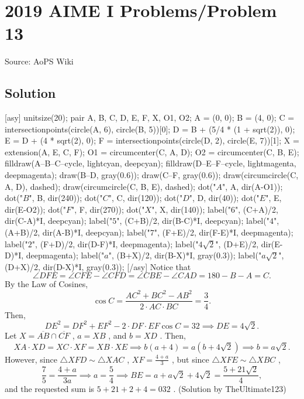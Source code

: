 \documentclass[12pt]{article}
\begin{document}
\section*{{2019 AIME I Problems/Problem 13}}
Source: AoPS Wiki

\subsection*{Solution}
[asy] unitsize(20); pair A, B, C, D, E, F, X, O1, O2; A = (0, 0); B = (4, 0); C = intersectionpoints(circle(A, 6), circle(B, 5))[0]; D = B + (5/4 * (1 + sqrt(2)), 0); E = D + (4 * sqrt(2), 0); F = intersectionpoints(circle(D, 2), circle(E, 7))[1]; X = extension(A, E, C, F); O1 = circumcenter(C, A, D); O2 = circumcenter(C, B, E); filldraw(A--B--C--cycle, lightcyan, deepcyan); filldraw(D--E--F--cycle, lightmagenta, deepmagenta); draw(B--D, gray(0.6)); draw(C--F, gray(0.6)); draw(circumcircle(C, A, D), dashed); draw(circumcircle(C, B, E), dashed); dot("$A$", A, dir(A-O1)); dot("$B$", B, dir(240)); dot("$C$", C, dir(120)); dot("$D$", D, dir(40)); dot("$E$", E, dir(E-O2)); dot("$F$", F, dir(270)); dot("$X$", X, dir(140)); label("$6$", (C+A)/2, dir(C-A)*I, deepcyan); label("$5$", (C+B)/2, dir(B-C)*I, deepcyan); label("$4$", (A+B)/2, dir(A-B)*I, deepcyan); label("$7$", (F+E)/2, dir(F-E)*I, deepmagenta); label("$2$", (F+D)/2, dir(D-F)*I, deepmagenta); label("$4\sqrt{2}$", (D+E)/2, dir(E-D)*I, deepmagenta); label("$a$", (B+X)/2, dir(B-X)*I, gray(0.3)); label("$a\sqrt{2}$", (D+X)/2, dir(D-X)*I, gray(0.3)); [/asy] Notice that \[\angle DFE=\angle CFE-\angle CFD=\angle CBE-\angle CAD=180-B-A=C.\] By the Law of Cosines, \[\cos C=\frac{AC^2+BC^2-AB^2}{2\cdot AC\cdot BC}=\frac34.\] Then, \[DE^2=DF^2+EF^2-2\cdot DF\cdot EF\cos C=32\implies DE=4\sqrt2.\] Let $X=\overline{AB}\cap\overline{CF}$ , $a=XB$ , and $b=XD$ . Then, \[XA\cdot XD=XC\cdot XF=XB\cdot XE\implies b(a+4)=a(b+4\sqrt2)\implies b=a\sqrt2.\] However, since $\triangle XFD\sim\triangle XAC$ , $XF=\tfrac{4+a}3$ , but since $\triangle XFE\sim\triangle XBC$ , \[\frac75=\frac{4+a}{3a}\implies a=\frac54\implies BE=a+a\sqrt2+4\sqrt2=\frac{5+21\sqrt2}4,\] and the requested sum is $5+21+2+4=\boxed{032}$ . (Solution by TheUltimate123)
\end{document}
